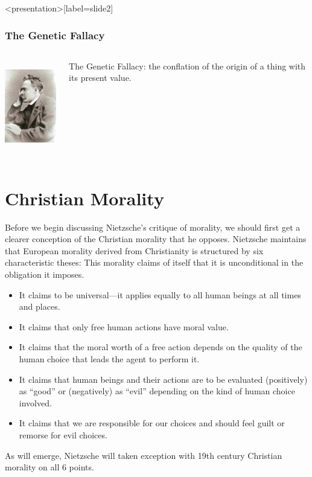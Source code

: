 \begin{frame}<presentation>[label=slide2]
    \frametitle{The Genetic Fallacy}
        \begin{columns}
            \begin{column}{3cm}
                \includegraphics[height=4cm]{../../graphics/nietzsche.jpg}
            \end{column}
            \begin{column}{7cm}
                \alert{The Genetic Fallacy}: the conflation of the origin of a thing with its present value.
            \end{column}
        \end{columns}
\end{frame}



\section{Christian Morality}\label{sec:christian_morality} %

Before we begin discussing Nietzsche's critique of morality, we should first get a clearer conception of the Christian morality that he opposes. Nietzsche maintains that European morality derived from Christianity is structured by six characteristic theses:
This morality claims of itself that it is unconditional in the obligation it imposes.
\begin{itemize}
	\item It claims to be universal---it applies equally to all human beings at all times and places.
	\item It claims that only free human actions have moral value.
	\item It claims that the moral worth of a free action depends on the quality of the human choice that leads the agent to perform it.
	\item It claims that human beings and their actions are to be evaluated (positively) as  ``good'' or (negatively) as  ``evil'' depending on the kind of human choice involved.
	\item It claims that we are responsible for our choices and should feel guilt or remorse for evil choices.
\end{itemize}
As will emerge, Nietzsche will taken exception with 19th century Christian morality on all 6 points.

